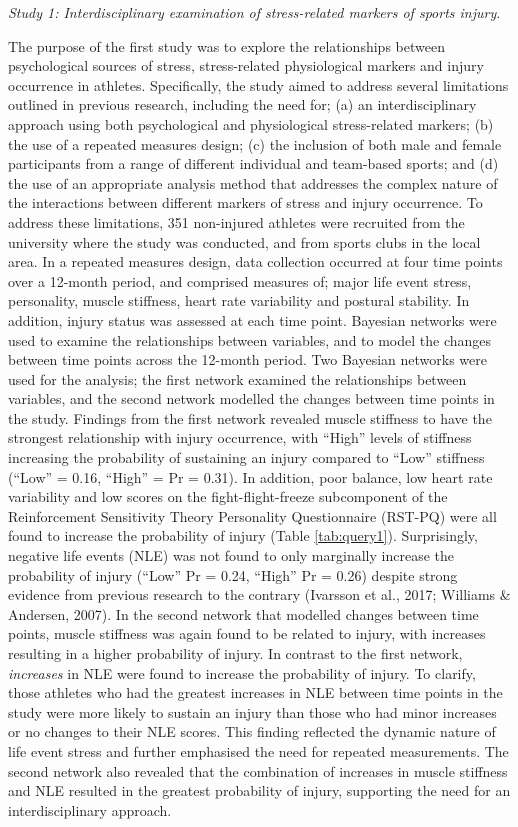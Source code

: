 \documentclass[man,floatsintext]{apa6}
\begin{document}
\emph{Study 1: Interdisciplinary examination of stress-related markers of sports injury}.

The purpose of the first study was to explore the relationships between psychological sources of stress, stress-related physiological markers and injury occurrence in athletes.
Specifically, the study aimed to address several limitations outlined in previous research, including the need for; (a) an interdisciplinary approach using both psychological and physiological stress-related markers; (b) the use of a repeated measures design; (c) the inclusion of both male and female participants from a range of different individual and team-based sports; and (d) the use of an appropriate analysis method that addresses the complex nature of the interactions between different markers of stress and injury occurrence. To address these limitations, 351 non-injured athletes were recruited from the university where the study was conducted, and from sports clubs in the local area.
In a repeated measures design, data collection occurred at four time points over a 12-month period, and comprised measures of; major life event stress, personality, muscle stiffness, heart rate variability and postural stability. In addition, injury status was assessed at each time point.
Bayesian networks were used to examine the relationships between variables, and to model the changes between time points across the 12-month period. Two Bayesian networks were used for the analysis; the first network examined the relationships between variables, and the second network modelled the changes between time points in the study.
Findings from the first network revealed muscle stiffness to have the strongest relationship with injury occurrence, with \enquote{High} levels of stiffness increasing the probability of sustaining an injury compared to \enquote{Low} stiffness (\enquote{Low} = 0.16, \enquote{High} = Pr = 0.31).
In addition, poor balance, low heart rate variability and low scores on the fight-flight-freeze subcomponent of the Reinforcement Sensitivity Theory Personality Questionnaire (RST-PQ) were all found to increase the probability of injury (Table \ref{tab:query1}).
Surprisingly, negative life events (NLE) was not found to only marginally increase the probability of injury (\enquote{Low} Pr = 0.24, \enquote{High} Pr = 0.26) despite strong evidence from previous research to the contrary (Ivarsson et al., 2017; Williams \& Andersen, 2007).
In the second network that modelled changes between time points, muscle stiffness was again found to be related to injury, with increases resulting in a higher probability of injury.
In contrast to the first network, \emph{increases} in NLE were found to increase the probability of injury.
To clarify, those athletes who had the greatest increases in NLE between time points in the study were more likely to sustain an injury than those who had minor increases or no changes to their NLE scores.
This finding reflected the dynamic nature of life event stress and further emphasised the need for repeated measurements.
The second network also revealed that the combination of increases in muscle stiffness and NLE resulted in the greatest probability of injury, supporting the need for an interdisciplinary approach.
\end{document}
